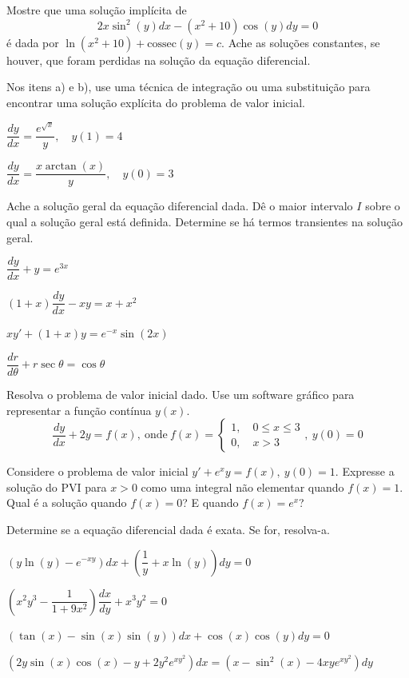 \documentclass[oneside,12pt,a4paper]{report}
\begin{document}
     Mostre que uma solução implícita de \[2x\sin^2(y)dx-(x^2+10)\cos(y)dy=0\] é dada por $\ln(x^2+10)+\mathrm{cossec}(y)=c$. Ache as soluções constantes, se houver, que foram perdidas na solução da equação diferencial.

     Nos itens a) e b), use uma técnica de integração ou uma substituição para encontrar uma solução explícita do problema de valor inicial.
    \begin{itensquestao}[2]
        \item $\dfrac{dy}{dx}=\dfrac{e^{\sqrt{x}}}{y},\quad y(1)=4$
        \item $\dfrac{dy}{dx}=\dfrac{x\arctan(x)}{y},\quad y(0)=3$
    \end{itensquestao}

     Ache a solução geral da equação diferencial dada. Dê o maior intervalo $I$ sobre o qual a solução geral está definida. Determine se há termos transientes na solução geral.
    \begin{itensquestao}[2]
        \item $\dfrac{dy}{dx}+y=e^{3x}$
        \item $(1+x)\dfrac{dy}{dx}-xy=x+x^2$
        \item $xy'+(1+x)y=e^{-x}\sin(2x)$
        \item $\dfrac{dr}{d\theta}+r\sec{\theta}=\cos{\theta}$
    \end{itensquestao}

     Resolva o problema de valor inicial dado. Use um software gráfico para representar a função contínua $y(x)$.
        \[\dfrac{dy}{dx}+2y=f(x),~\text{onde}~f(x)=
        \begin{cases}
            1,\quad0\leq x\leq 3\\
            0,\quad x>3
        \end{cases},~y(0)=0\]

     Considere o problema de valor inicial $y'+e^xy=f(x),~y(0)=1$. Expresse a solução do PVI para $x>0$ como uma integral não elementar quando $f(x)=1$. Qual é a solução quando $f(x)=0$? E quando $f(x)=e^x$?

     Determine se a equação diferencial dada é exata. Se for, resolva-a.
    \begin{itensquestao}[1]
        \item $(y\ln(y)-e^{-xy})dx+\left(\dfrac{1}{y}+x\ln(y)\right)dy=0$
        \item $\left(x^2y^3-\dfrac{1}{1+9x^2}\right)\dfrac{dx}{dy}+x^3y^2=0$
        \item $(\tan(x)-\sin(x)\sin(y))dx+\cos(x)\cos(y)dy=0$
        \item $(2y\sin(x)\cos(x)-y+2y^2e^{xy^2})dx=(x-\sin^2(x)-4xye^{xy^2})dy$
    \end{itensquestao}
\end{document}
